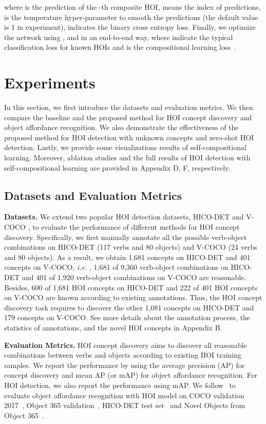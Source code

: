 \documentclass[runningheads]{llncs}
\newcommand{\ie}{\textit{i.e. }}
\begin{document}
where  is the prediction of the -th composite HOI,  means the index of predictions,  is the temperature hyper-parameter to smooth the predictions (the default value is 1 in experiment),  indicates the binary cross entropy loss. Finally, we optimize the network using
,  and  in an end-to-end way, where  indicate the typical classification loss for known HOIs and  is the compositional learning loss~\cite{hou2020visual}.


\section{Experiments}
\label{sec:exp}

In this section, we first introduce the datasets and evaluation metrics. We then compare the baseline and the proposed method for HOI concept discovery and object affordance recognition. We also demonstrate the effectiveness of the proposed method for HOI detection with unknown concepts and zero-shot HOI detection. Lastly, we provide some visualizations results of self-compositional learning. Moreover, ablation studies and the full results of HOI detection with self-compositional learning are provided in Appendix D, F, respectively.

\subsection{Datasets and Evaluation Metrics}

\textbf{Datasets.} We extend two popular HOI detection datasets, HICO-DET \cite{chao2018learning} and V-COCO \cite{gupta2015visual}, to evaluate the performance of different methods for HOI concept discovery. Specifically, we first manually annotate all the possible verb-object combinations on HICO-DET (117 verbs and 80 objects) and V-COCO (24 verbs and 80 objects). As a result, we obtain 1,681 concepts on HICO-DET and 401 concepts on V-COCO, \ie, 1,681 of 9,360 verb-object combinations on HICO-DET and 401 of 1,920 verb-object combinations on V-COCO are reasonable. Besides, 600 of 1,681 HOI concepts on HICO-DET and 222 of 401 HOI concepts on V-COCO are known according to existing annotations. Thus, the HOI concept discovery task requires to discover the other 1,081 concepts on HICO-DET and 179 concepts on V-COCO. See more details about the annotation process, the statistics of annotations, and the novel HOI concepts in Appendix B.

\textbf{Evaluation Metrics.} HOI concept discovery aims to discover all reasonable combinations between verbs and objects according to existing HOI training samples. We report the performance by using the average precision (AP) for concept discovery and mean AP (or mAP) for object affordance recognition. For HOI detection, we also report the performance using mAP. We follow~\cite{hou2021atl} to evaluate object affordance recognition with HOI model on COCO validation 2017~\cite{lin2014microsoft}, Object 365 validation~\cite{Shao2020Objects365}, HICO-DET test set~\cite{chao2018learning} and Novel Objects from Object 365~\cite{Shao2020Objects365}.
\end{document}
